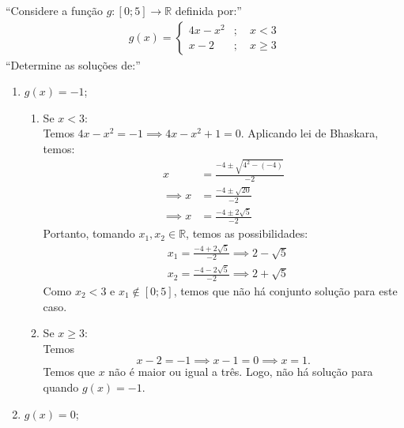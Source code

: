 \enquote{Considere a função $g: [0; 5] \rightarrow \mathbb{R}$ definida por:}
        \begin{align*}
            g(x) = \left\{
                \begin{aligned}
                    4x - x^2 &; \quad x < 3 \\
                    x - 2 &; \quad x \ge 3
                \end{aligned}
                \right.
        \end{align*}
        \enquote{Determine as soluções de:}
        \begin{enumerate}
            \item $g(x) = -1$;
            \begin{enumerate}
                \item Se $x < 3$: \\ 
                    Temos $4x - x^2 = -1 \implies 4x - x^2 + 1 = 0$. Aplicando lei de Bhaskara, temos:
                    \begin{align*}
                        x &= \frac{-4 \pm \sqrt{4^2 - (-4)}}{-2} \\ \implies 
                        x &= \frac{-4 \pm \sqrt{20}}{-2} \\ \implies
                        x &= \frac{-4 \pm 2\sqrt{5}}{-2}
                    \end{align*}
                    Portanto, tomando $x_1, x_2 \in \mathbb{R}$, temos as possibilidades:
                    \begin{align*}
                        &x_1 = \frac{-4 + 2\sqrt{5}}{-2} \implies 2 - \sqrt{5} \\ 
                        &x_2 = \frac{-4 -2\sqrt{5}}{-2} \implies 2 + \sqrt{5}   
                    \end{align*}
                    Como $x_2 < 3$ e $x_1 \notin [0; 5]$, temos que não há conjunto solução para este caso. 
                \item Se $x \ge 3$: \\
                    Temos \begin{displaymath}
                        x - 2 = -1 \implies x - 1 = 0 \implies x = 1.
                    \end{displaymath}
                    Temos que $x$ não é maior ou igual a três. Logo, não há solução para quando $g(x) = -1$.
                \end{enumerate}
            \item $g(x) = 0$;
            \begin{enumerate}

\end{enumerate}
\end{enumerate}
